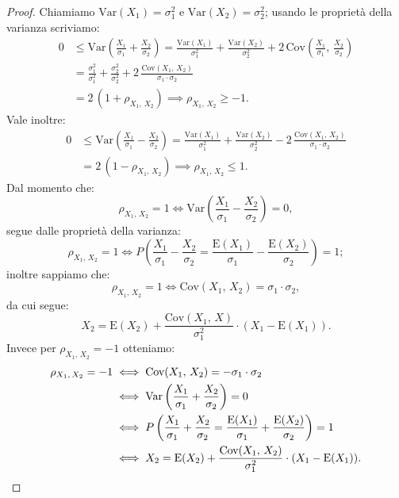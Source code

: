         \begin{proof}
            Chiamiamo $\text{Var}(X_1) = \sigma_1^2$ e $\text{Var}(X_2) = \sigma_2^2$; usando le proprietà della varianza scriviamo:
            \begin{align*}
                0 &\leq \text{Var}\left(\frac{X_1}{\sigma_1}+\frac{X_2}{\sigma_2}\right)=
                \frac{\text{Var}(X_1)}{\sigma_1^2} + \frac{\text{Var}(X_2)}{\sigma_2^2} + 2\,\text{Cov}\left(\frac{X_1}{\sigma_1},\,\frac{X_2}{\sigma_2}\right) \\
                &= \frac{\sigma_1^2}{\sigma_1^2} + \frac{\sigma_2^2}{\sigma_2^2} + 2\,\frac{\text{Cov}(X_1,\,X_2)}{\sigma_1 \cdot \sigma_2} \\
                &= 2\, (1 + \rho_{X_1,\,X_2}) \implies \rho_{X_1,\,X_2} \geq -1
            .\end{align*}
            Vale inoltre:
            \begin{align*}
                0 &\leq \text{Var}\left(\frac{X_1}{\sigma_1}-\frac{X_2}{\sigma_2}\right) = 
                \frac{\text{Var}(X_1)}{\sigma_1^2} + \frac{\text{Var}(X_2)}{\sigma_2^2} 
                -2\, \frac{\text{Cov}(X_1,\,X_2)}{\sigma_1 \cdot \sigma_2} \\
                  &= 2\, (1 - \rho_{X_1,\,X_2}) \implies \rho_{X_1,\,X_2} \leq 1
            .\end{align*}
            Dal momento che: \[
                \rho_{X_1,\,X_2} = 1 \iff \text{Var}\left(\frac{X_1}{\sigma_1} - \frac{X_2}{\sigma_2}\right) = 0
            ,\] segue dalle proprietà della varianza: \[
            \rho_{X_1,\,X_2} = 1 \iff P\left(\frac{X_1}{\sigma_1}-\frac{X_2}{\sigma_2} = 
            \frac{\text{E}(X_1)}{\sigma_1}-\frac{\text{E}(X_2)}{\sigma_2}\right) = 1
            ;\] inoltre sappiamo che: \[
            \rho_{X_1,\,X_2} = 1 \iff \text{Cov}(X_1,\,X_2)=\sigma_1 \cdot \sigma_2
            ,\] da cui segue: \[
            X_2 = \text{E}(X_2) + \frac{\text{Cov}(X_1,\,X)}{\sigma_1^2} \cdot (X_1 - \text{E}(X_1))
            .\] Invece per $\rho_{X_1,\,X_2} = -1$ otteniamo:
            \begin{align*}
                \rho_{X_1,\,X_2} = -1 &\iff \text{Cov}(X_1,\,X_2) = -\sigma_1 \cdot \sigma_2 \\
                &\iff \text{Var}\left(\frac{X_1}{\sigma_1}+\frac{X_2}{\sigma_2}\right) = 0 \\
                &\iff P\left(\frac{X_1}{\sigma_1}+\frac{X_2}{\sigma_2}= \frac{\text{E}(X_1)}{\sigma_1}+\frac{\text{E}(X_2)}{\sigma_2}\right) = 1 \\
                &\iff X_2 = \text{E}(X_2) + \frac{\text{Cov}(X_1,\,X_2)}{\sigma_1^2} \cdot (X_1 - \text{E}(X_1))
                \qedhere
            .\end{align*}
        \end{proof}

